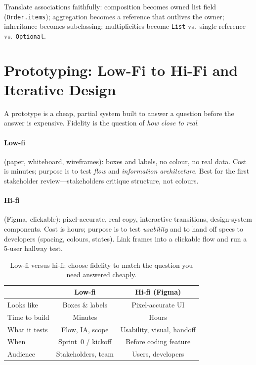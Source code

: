 Translate associations faithfully: composition becomes owned list field (\texttt{Order.items}); aggregation becomes a reference that outlives the owner; inheritance becomes subclassing; multiplicities become \texttt{List} vs.\ single reference vs.\ \texttt{Optional}.

\section{Prototyping: Low-Fi to Hi-Fi and Iterative Design}
\label{sec:prototyping}
A prototype is a cheap, partial system built to answer a question before the answer is expensive. Fidelity is the question of \emph{how close to real}.

\paragraph{Low-fi} (paper, whiteboard, wireframes): boxes and labels, no colour, no real data. Cost is minutes; purpose is to test \emph{flow} and \emph{information architecture}. Best for the first stakeholder review---stakeholders critique structure, not colours.

\paragraph{Hi-fi} (Figma, clickable): pixel-accurate, real copy, interactive transitions, design-system components. Cost is hours; purpose is to test \emph{usability} and to hand off specs to developers (spacing, colours, states). Link frames into a clickable flow and run a 5-user hallway test.

\begin{table}[h]
\centering\small
\begin{tabular}{@{}lcc@{}}
\toprule
 & Low-fi & Hi-fi (Figma) \\
\midrule
Looks like & Boxes \& labels & Pixel-accurate UI \\
Time to build & Minutes & Hours \\
What it tests & Flow, IA, scope & Usability, visual, handoff \\
When & Sprint~0 / kickoff & Before coding feature \\
Audience & Stakeholders, team & Users, developers \\
\bottomrule
\end{tabular}
\caption{Low-fi versus hi-fi: choose fidelity to match the question you need answered cheaply.}
\label{tab:prototype-fidelity}
\end{table}

